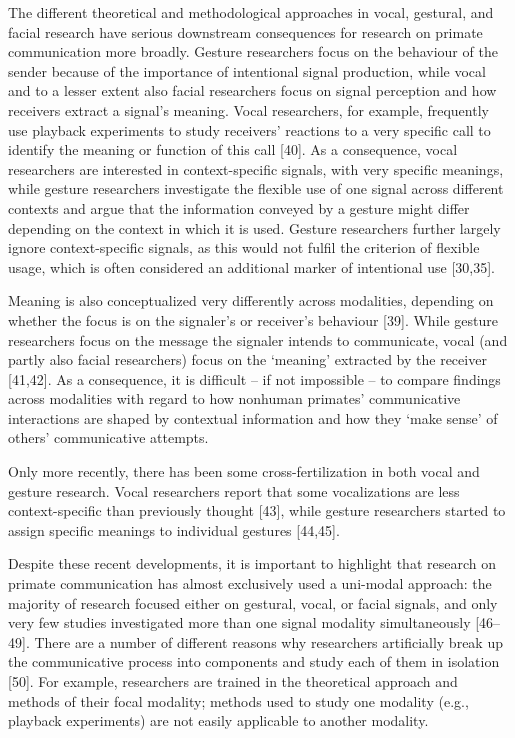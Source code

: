 \documentclass[
  man,floatsintext]{apa6}
\begin{document}
The different theoretical and methodological approaches in vocal, gestural, and facial research have serious downstream consequences for research on primate communication more broadly. Gesture researchers focus on the behaviour of the sender because of the importance of intentional signal production, while vocal and to a lesser extent also facial researchers focus on signal perception and how receivers extract a signal's meaning. Vocal researchers, for example, frequently use playback experiments to study receivers' reactions to a very specific call to identify the meaning or function of this call {[}40{]}. As a consequence, vocal researchers are interested in context-specific signals, with very specific meanings, while gesture researchers investigate the flexible use of one signal across different contexts and argue that the information conveyed by a gesture might differ depending on the context in which it is used. Gesture researchers further largely ignore context-specific signals, as this would not fulfil the criterion of flexible usage, which is often considered an additional marker of intentional use {[}30,35{]}.

Meaning is also conceptualized very differently across modalities, depending on whether the focus is on the signaler's or receiver's behaviour {[}39{]}. While gesture researchers focus on the message the signaler intends to communicate, vocal (and partly also facial researchers) focus on the `meaning' extracted by the receiver {[}41,42{]}. As a consequence, it is difficult -- if not impossible -- to compare findings across modalities with regard to how nonhuman primates' communicative interactions are shaped by contextual information and how they `make sense' of others' communicative attempts.

Only more recently, there has been some cross-fertilization in both vocal and gesture research. Vocal researchers report that some vocalizations are less context-specific than previously thought {[}43{]}, while gesture researchers started to assign specific meanings to individual gestures {[}44,45{]}.

Despite these recent developments, it is important to highlight that research on primate communication has almost exclusively used a uni-modal approach: the majority of research focused either on gestural, vocal, or facial signals, and only very few studies investigated more than one signal modality simultaneously {[}46--49{]}. There are a number of different reasons why researchers artificially break up the communicative process into components and study each of them in isolation {[}50{]}. For example, researchers are trained in the theoretical approach and methods of their focal modality; methods used to study one modality (e.g., playback experiments) are not easily applicable to another modality.
\end{document}
